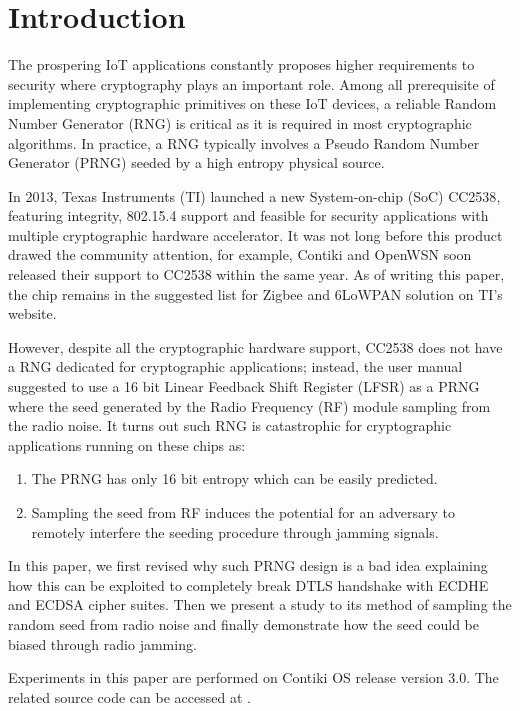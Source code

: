 \section{Introduction}
The prospering IoT applications constantly proposes higher requirements to security where cryptography plays an important role. Among all prerequisite of implementing cryptographic primitives on these IoT devices, a reliable Random Number Generator (RNG) is critical as it is required in most cryptographic algorithms. In practice, a RNG typically involves a Pseudo Random Number Generator (PRNG) seeded by a high entropy physical source.

In 2013, Texas Instruments (TI) launched a new System-on-chip (SoC)  CC2538\cite{CC2538}, featuring integrity, 802.15.4 support and feasible for security applications with multiple cryptographic hardware accelerator. It was not long before this product drawed the community attention, for example, Contiki and OpenWSN soon released their support to CC2538 within the same year. As of writing this paper, the chip remains in the suggested list for Zigbee and 6LoWPAN solution on TI's website\cite{ZigbeeProducts}\cite{6LowPANProducts}.

However, despite all the cryptographic hardware support, CC2538 does not have a RNG dedicated for cryptographic applications; instead, the user manual suggested to use a 16 bit Linear Feedback Shift Register (LFSR) as a PRNG where the seed generated by the Radio Frequency (RF) module sampling from the radio noise. It turns out such RNG is catastrophic for cryptographic applications running on these chips as:
\begin{enumerate}
	\item The PRNG has only 16 bit entropy which can be easily predicted.
	\item Sampling the seed from RF induces the potential for an adversary to remotely interfere the seeding procedure through jamming signals.
\end{enumerate}

In this paper, we first revised why such PRNG design is a bad idea explaining how this can be exploited to completely break DTLS handshake with ECDHE and ECDSA cipher suites. Then we present a study to its method of sampling the random seed from radio noise and finally demonstrate how the seed could be biased through radio jamming. 

Experiments in this paper are performed on Contiki OS\cite{Contiki} release version 3.0. The related source code can be accessed at \cite{prngtest}.

